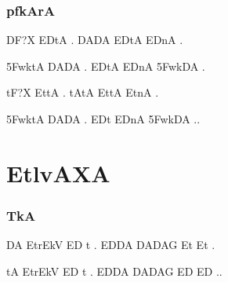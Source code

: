 \def\DevnagVersion{2.17}\documentclass{tufte-book}
\begin{document}
\subsection{{\dn p\?fkArA}}
\noindent
{\dn 

DF?X ED\2tA . DADA ED\2tA ED\2nA .

\35FwktA DADA . ED\2tA ED\2nA \35FwkDA .

tF?X Et\2tA . tAtA Et\2tA Et\2nA .

\35FwktA DADA . ED\2t ED\2nA \35FwkDA ..

}

{\dn
\chapter{EtlvAXA}}

\subsection{{\dn T\?kA}}
\noindent
{\dn

DA EtrEkV ED\2 t . ED\2DA DADAG\? Et\2 Et\2 .

tA EtrEkV ED\2 t . ED\2DA DADAG\? ED\2 ED\2 ..
}
\end{document}
